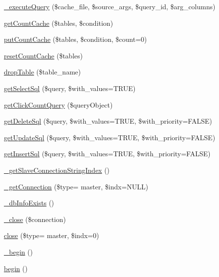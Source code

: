 \begin{DoxyCompactItemize}
\item 
\hyperlink{classDB_ae3febd3b468fd75f9606f247489d5512}{\+\_\+execute\+Query} (\$cache\+\_\+file, \$source\+\_\+args, \$query\+\_\+id, \$arg\+\_\+columns)
\item 
\hyperlink{classDB_af638cf3ae9ad406810b2f8c2d322225c}{get\+Count\+Cache} (\$tables, \$condition)
\item 
\hyperlink{classDB_a90771d4eaa0ff60a1ddbeb338f2ab801}{put\+Count\+Cache} (\$tables, \$condition, \$count=0)
\item 
\hyperlink{classDB_a8167fd227a1955f8300c0d0e70dd9d9e}{reset\+Count\+Cache} (\$tables)
\item 
\hyperlink{classDB_a63a3a5bdc8e30e1cee37cefddd5ce8de}{drop\+Table} (\$table\+\_\+name)
\item 
\hyperlink{classDB_a5324aefa22399846c6a7fb8afeb6e55d}{get\+Select\+Sql} (\$query, \$with\+\_\+values=T\+R\+U\+E)
\item 
\hyperlink{classDB_a75a6b61801ef6ed2bbf092f1333a8ccd}{get\+Click\+Count\+Query} (\$query\+Object)
\item 
\hyperlink{classDB_aeb58bf0e323895cdc7eda34f09254ed6}{get\+Delete\+Sql} (\$query, \$with\+\_\+values=T\+R\+U\+E, \$with\+\_\+priority=F\+A\+L\+S\+E)
\item 
\hyperlink{classDB_ac467d003673def17f4d397e3f25bcf84}{get\+Update\+Sql} (\$query, \$with\+\_\+values=T\+R\+U\+E, \$with\+\_\+priority=F\+A\+L\+S\+E)
\item 
\hyperlink{classDB_a2664c0b5ba2bc70d02504ebf343e913e}{get\+Insert\+Sql} (\$query, \$with\+\_\+values=T\+R\+U\+E, \$with\+\_\+priority=F\+A\+L\+S\+E)
\item 
\hyperlink{classDB_a8dc4e826557c3de0d49adf7e6112bfea}{\+\_\+get\+Slave\+Connection\+String\+Index} ()
\item 
\hyperlink{classDB_a52b496d073cecfd2ca6e14897b559819}{\+\_\+get\+Connection} (\$type= \textquotesingle{}master\textquotesingle{}, \$indx=N\+U\+L\+L)
\item 
\hyperlink{classDB_a3bbfb0e7579e8d6fc27a20c1219bb693}{\+\_\+db\+Info\+Exists} ()
\item 
\hyperlink{classDB_a8c161612a558f47fb008dec4b46ee05c}{\+\_\+close} (\$connection)
\item 
\hyperlink{classDB_a99ab404981e46ae5b48e11ce46290500}{close} (\$type= \textquotesingle{}master\textquotesingle{}, \$indx=0)
\item 
\hyperlink{classDB_ab081086c9f44c12dce30d78e00141986}{\+\_\+begin} ()
\item 
\hyperlink{classDB_a41aea6b3a6787467fcfd16d28a302c54}{begin} ()

\end{DoxyCompactItemize}
